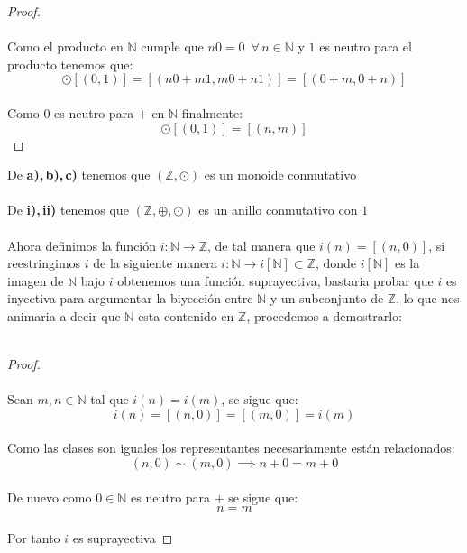 \documentclass[11pt,letterpaper]{article}
\newcommand{\N}{\mathbb{N}}
\newcommand{\Z}{\mathbb{Z}}
\begin{document}
\begin{itemize}
\begin{proof}
\begin{equation*}
        \end{equation*}\,\\
        Como el producto en $\N$ cumple que $n0=0\,\,\,\forall\,n\in \N$ y $1$ es neutro para el producto tenemos que:\,\\
        \begin{equation*}
            [(n,m)]\odot[(0,1)]=[(n0+m1,m0+n1)]=[(0+m,0+n)]
        \end{equation*}\,\\
        Como $0$ es neutro para $+$ en $\N$ finalmente:\,\\
        \begin{equation*}
            [(n,m)]\odot[(0,1)]=[(n,m)]
        \end{equation*}        
    \end{proof}
    \end{itemize}
    De \textbf{a),\,b),\,c)} tenemos que $(\Z,\odot)$ es un monoide conmutativo\,\\
    \,\\
    De \textbf{i),\,ii)} tenemos que $(\Z,\oplus,\odot)$ es un anillo conmutativo con $1$\,\\
    \,\\
    Ahora definimos la funci\'on $i:\N\rightarrow \Z$, de tal manera que $i(n)=[(n,0)]$, si reestringimos $i$ de la siguiente manera
    $i:\N\rightarrow i[\N]\subset \Z$, donde $i[\N]$ es la imagen de $\N$ bajo $i$ obtenemos una funci\'on suprayectiva, bastaria
    probar que $i$ es inyectiva para argumentar la biyecci\'on entre $\N$ y un subconjunto de $\Z$, lo que nos animaria a decir que
    $\N$ esta contenido en $\Z$, procedemos a demostrarlo:\,\\
    \,\\
    \begin{proof}\,\\
        \,\\
        Sean $m,n\in \N$ tal que $i(n)=i(m)$, se sigue que:\,\\
        \begin{equation*}
            i(n)=[(n,0)]=[(m,0)]=i(m)
        \end{equation*}\,\\
        Como las clases son iguales los representantes necesariamente est\'an relacionados:\,\\
        \begin{equation*}
            (n,0)\sim(m,0)\implies n+0=m+0
        \end{equation*}\,\\
        De nuevo como $0\in \N$ es neutro para $+$ se sigue que:\,\\
        \begin{equation*}
            n=m
        \end{equation*}\,\\
        Por tanto $i$ es suprayectiva
    \end{proof}\,\\
\end{document}
